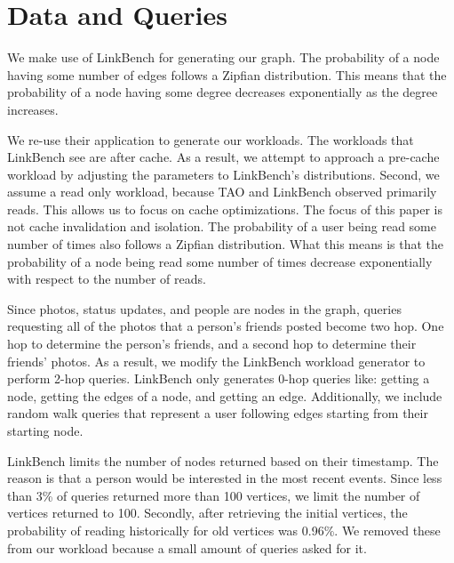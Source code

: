 \section{Data and Queries}

We make use of LinkBench for generating our graph.  The probability of a node
having some number of edges follows a Zipfian distribution. This means that the
probability of a node having some degree decreases exponentially as the degree
increases.

We re-use their application to generate our workloads. The workloads
that LinkBench see are after cache. As a result, we attempt to approach a
pre-cache workload by adjusting the parameters to LinkBench's distributions.
Second, we assume a read only workload, because TAO and LinkBench observed
primarily reads. This allows us to focus on cache optimizations. The focus of
this paper is not cache invalidation and isolation. The probability of a user
being read some number of times also follows a Zipfian distribution. What this
means is that the probability of a node being read some number of times
decrease exponentially with respect to the number of reads.

Since photos, status updates, and people are nodes in the graph, queries requesting
all of the photos that a person's friends posted become two hop. One hop to
determine the person's friends, and a second hop to determine their friends' photos.
As a result, we modify the LinkBench workload generator to perform 2-hop queries.
LinkBench only generates 0-hop queries like: getting a node, getting the edges of a
node, and getting an edge. Additionally, we include random walk queries that
represent a user following edges starting from their starting node.

LinkBench limits the number of nodes returned based on their timestamp. The
reason is that a person would be interested in the most recent events. Since
less than 3\% of queries returned more than 100 vertices, we limit the number of
vertices returned to 100. Secondly, after retrieving the initial vertices, the
probability of reading historically for old vertices was 0.96\%. We removed
these from our workload because a small amount of queries asked for it.
